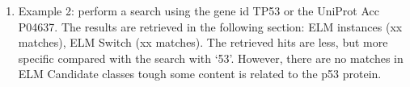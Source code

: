\begin{enumerate}
\item Example 2: perform a search using the gene id TP53 or the UniProt Acc
	P04637. The results are retrieved in the following section: ELM
	instances (xx matches), ELM Switch (xx matches). The retrieved hits are
	less, but more specific compared with the search with `53'. However,
	there are no matches in ELM Candidate classes tough some content is
	related to the p53 protein.

\end{enumerate}
